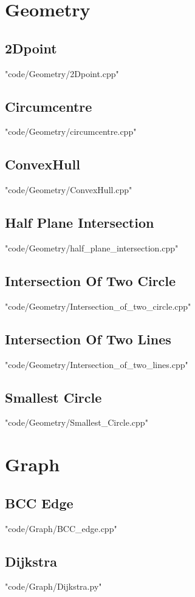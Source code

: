 \documentclass[landscape, 8pt,twocolumn,oneside, a4paper]{article}
\begin{document}
\section{Geometry}
\subsection{2Dpoint}
 {"code/Geometry/2Dpoint.cpp"}
\subsection{Circumcentre}
 {"code/Geometry/circumcentre.cpp"}
\subsection{ConvexHull}
 {"code/Geometry/ConvexHull.cpp"}
\subsection{Half Plane Intersection}
 {"code/Geometry/half_plane_intersection.cpp"}
\subsection{Intersection Of Two Circle}
 {"code/Geometry/Intersection_of_two_circle.cpp"}
\subsection{Intersection Of Two Lines}
 {"code/Geometry/Intersection_of_two_lines.cpp"}
\subsection{Smallest Circle}
 {"code/Geometry/Smallest_Circle.cpp"}
\section{Graph}
\subsection{BCC Edge}
 {"code/Graph/BCC_edge.cpp"}
\subsection{Dijkstra}
 {"code/Graph/Dijkstra.py"}
\end{document}
